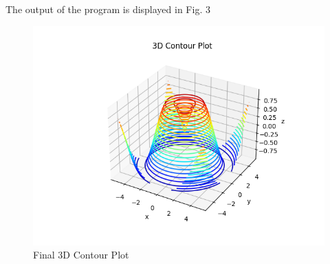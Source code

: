 \documentclass[
11pt, %
a4paper, %
oneside, %
headinclude,footinclude, %
BCOR5mm, %
]{scrartcl}
\begin{document}
The output of the program is displayed in Fig. 3

\begin{figure}[H]
	\centering %
	\includegraphics[width=0.4\columnwidth]{Figures/Figure3.png} 
	\caption[Final 3D Contour Plot]{Final 3D Contour Plot} %
	\label{fig:gallery} 
\end{figure}
\renewcommand{\refname}{\spacedlowsmallcaps{References}} %
\raggedright



\end{document}
